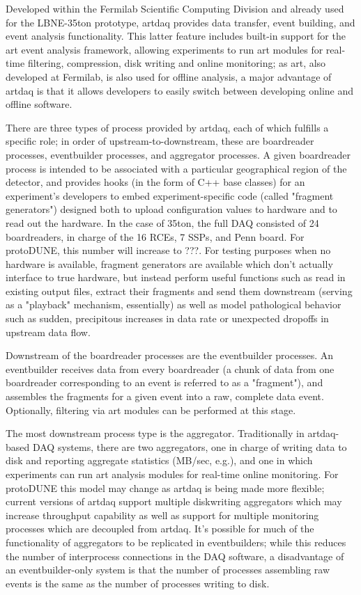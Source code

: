 Developed within the Fermilab Scientific Computing Division and
already used for the LBNE-35ton prototype, artdaq provides data
transfer, event building, and event analysis functionality. This
latter feature includes built-in support for the art event analysis
framework, allowing experiments to run art modules for real-time
filtering, compression, disk writing and online monitoring; as art,
also developed at Fermilab, is also used for offline analysis, a major
advantage of artdaq is that it allows developers to easily switch
between developing online and offline software.

There are three types of process provided by artdaq, each of which
fulfills a specific role; in order of upstream-to-downstream, these
are boardreader processes, eventbuilder processes, and aggregator
processes. A given boardreader process is intended to be associated
with a particular geographical region of the detector, and provides
hooks (in the form of C++ base classes) for an experiment's developers
to embed experiment-specific code (called "fragment generators")
designed both to upload configuration values to hardware and to read
out the hardware. In the case of 35ton, the full DAQ consisted of 24
boardreaders, in charge of the 16 RCEs, 7 SSPs, and Penn board. For
protoDUNE, this number will increase to ???. For testing purposes when
no hardware is available, fragment generators are available which
don't actually interface to true hardware, but instead perform useful
functions such as read in existing output files, extract their
fragments and send them downstream (serving as a "playback" mechanism,
essentially) as well as model pathological behavior such as sudden,
precipitous increases in data rate or unexpected dropoffs in upstream
data flow.

Downstream of the boardreader processes are the eventbuilder
processes. An eventbuilder receives data from every boardreader (a
chunk of data from one boardreader corresponding to an event is
referred to as a "fragment"), and assembles the fragments for a given
event into a raw, complete data event. Optionally, filtering via art
modules can be performed at this stage.

The most downstream process type is the aggregator. Traditionally in
artdaq-based DAQ systems, there are two aggregators, one in charge of
writing data to disk and reporting aggregate statistics (MB/sec,
e.g.), and one in which experiments can run art analysis modules for
real-time online monitoring. For protoDUNE this model may change as
artdaq is being made more flexible; current versions of artdaq support
multiple diskwriting aggregators which may increase throughput
capability as well as support for multiple monitoring processes which
are decoupled from artdaq. It's possible for much of the functionality
of aggregators to be replicated in eventbuilders; while this reduces
the number of interprocess connections in the DAQ software, a
disadvantage of an eventbuilder-only system is that the number of
processes assembling raw events is the same as the number of processes
writing to disk.

